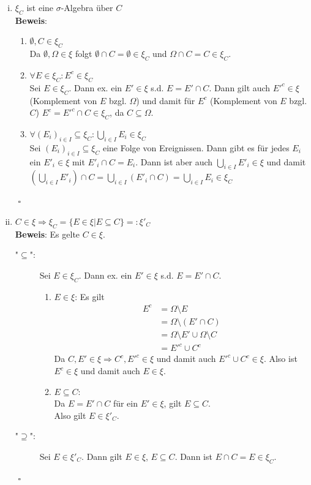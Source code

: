 \documentclass[11pt,a4paper,ngerman]{article}
\newcommand{\set}[1]{ \{ #1 \}}
\begin{document}
\begin{enumerate}[(i)]
\item $\xi_C$ ist eine $\sigma$-Algebra  über $C$\\
\textbf{Beweis}:
\begin{enumerate}[(1)]
\item $\emptyset ,C \in \xi_C$ \\
Da $\emptyset, \Omega \in \xi$ folgt $\emptyset \cap C = \emptyset \in \xi_C$ und $\Omega \cap C = C \in \xi_C$.
\item $\forall E \in \xi_C: E^c \in \xi_C$ \\
Sei $E \in \xi_C$. Dann ex. ein $E' \in \xi$ s.d. $E = E' \cap C$. Dann gilt auch $E'^c \in \xi$ (Komplement von $E$ bzgl. $\Omega$) und damit für 
$E^c$ (Komplement von $E$ bzgl. $C$) $E^c = E'^c \cap C \in \xi_C$, da $C \subseteq \Omega$. 
\item $\forall \left(E_i\right)_{i \in I} \subseteq \xi_C: \bigcup_{i \in I} {E_i} \in \xi_C$  \\
Sei $\left(E_i\right)_{i \in I} \subseteq \xi_C$ eine Folge von Ereignissen. Dann gibt es für jedes $E_i$ ein $E'_i \in \xi$ mit $E'_i \cap C = E_i$.
Dann ist aber auch $\bigcup_{i \in I} E'_i \in \xi$ und damit $\left( \bigcup_{i \in I} E'_i \right) \cap C = \bigcup_{i \in I} \left( E'_i \cap C \right) = \bigcup_{i \in I} E_i \in \xi_C$
\end{enumerate}
$\mbox{}$ \hfill $\square$

\item $C \in \xi \Rightarrow \xi_C = \set{E \in \xi | E \subseteq C} =: \xi'_C$ \\
\textbf{Beweis}: Es gelte $C \in \xi$. 
\begin{description}
\item["$\subseteq$":] 
Sei $E \in \xi_C$. Dann ex. ein $E' \in \xi$ s.d. $E = E' \cap C$. 
\begin{enumerate}[(1)]
\item $E \in \xi$: Es gilt
\begin{equation}\begin{split}
E^c &= \Omega \setminus E \\
&= \Omega \setminus \left(E' \cap C \right) \\
&= \Omega \setminus E' \cup \Omega \setminus C \\
&= E'^c \cup C^c
\end{split}\end{equation}
Da $C, E' \in \xi \Rightarrow C^c, E'^c \in \xi$ und damit auch $E'^c \cup C^c \in \xi$. Also ist $E^c \in \xi$ und damit auch $E \in \xi$.

\item $E \subseteq C$: \\
	Da $E = E' \cap C$ für ein $E' \in \xi$, gilt $E \subseteq C$.\\
Also gilt $E \in \xi'_C$.
\end{enumerate}
\item["$\supseteq$":] 
Sei $E \in \xi'_C$. Dann gilt $E \in \xi$, $E \subseteq C$. Dann ist  $E \cap C = E \in \xi_C$.
\end{description}
$\mbox{}$ \hfill $\square$
\end{enumerate}
\end{document}
